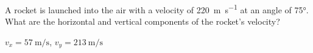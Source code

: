 \begin{question}[ID=vectors-C-Q03,topic=vectors,difficulty=C]
    A rocket is launched into the air with a velocity of
        \SI{220}{\meter\per\second} at an angle of \ang{75}.
    What are the horizontal and vertical components of
        the rocket's velocity?
\end{question}
\begin{solution}
    $v_{x} = \SI{57}{\meter\per\second}$,
    $v_{y} = \SI{213}{\meter\per\second}$
\end{solution}


\endinput

